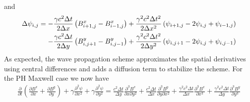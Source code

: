 \documentclass[11pt, reqno]{amsart}
\newcommand{\pfrac}[2]{\frac{\partial #1}{\partial #2}}
\newcommand{\pfracc}[2]{\frac{\partial^2 #1}{\partial #2^2}}
\newcommand{\pfraca}[1]{\frac{\partial}{\partial #1}}
\begin{document}
and
\begin{align}
  \Delta \psi_{i,j} = 
  -\frac{\gamma c^2 \Delta t}{2 \Delta x}
  \left(
    B^x_{i+1,j} - B^x_{i-1,j}
  \right)
  +
  \frac{\gamma^2 c^2 \Delta t^2}{2 \Delta x^2}
  \left(
    \psi_{i+1,j} - 2\psi_{i,j} + \psi_{i-1,j}
  \right) \notag \\
  -
  \frac{\gamma c^2 \Delta t}{2 \Delta y}
  \left(
    B^y_{i,j+1} - B^y_{i,j-1}
  \right)
  +
  \frac{\gamma^2 c^2 \Delta t^2}{2 \Delta y^2}
  \left(
    \psi_{i,j+1} - 2\psi_{i,j} + \psi_{i,j-1}
  \right)
\end{align}
As expected, the wave propagation scheme approximates the spatial
derivatives using central differences and adds a diffusion term to
stabilize the scheme. For the PH Maxwell case we now have
\begin{align}
  \pfraca{t}
  \left(
    \pfrac{B^x}{x} + \pfrac{B^y}{y}
  \right)
  +
  \gamma \pfracc{\psi}{x} + \gamma \pfracc{\psi}{y}
  =
  \frac{c^2 \Delta t}{\Delta y}
  \frac{\partial^3B^x}{\partial x \partial y^2}
  +
  \frac{c^2 \Delta t}{\Delta x}
  \frac{\partial^3B^y}{\partial y \partial x^2}
  +
  \frac{\gamma^2 c^2 \Delta t}{\Delta x}
  \frac{\partial^3B^x}{\partial x^3}
  +
  \frac{\gamma^2 c^2 \Delta t}{\Delta y}
  \frac{\partial^3B^y}{\partial y^3}
\end{align}
\end{document}
